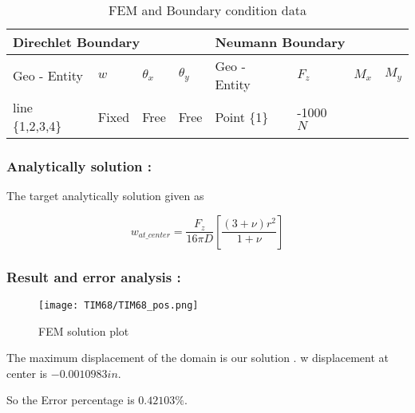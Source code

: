 \documentclass[VM.tex]{subfiles}
\begin{document}
\begin{table}[h!]
\renewcommand{\arraystretch}{1.5}
\centering
\caption{FEM and Boundary condition data}
\label{my-label}
\begin{tabular}{|l|lll|l|lll|}
\hline   \multicolumn{4}{l|}{\cellcolor[HTML]{C0C0C0}Direchlet Boundary} & \multicolumn{4}{l|}{\cellcolor[HTML]{C0C0C0}Neumann Boundary} \\ \hline \hline
 Geo - \newline Entity      & $w$          & $\theta _ x$     & $\theta _ y $    & Geo - \newline Entity         & $F_z$        & $M_x$        & $M_y$        \\ \hline   
line \{1,2,3,4\}                   & Fixed      & Free         & Free        & Point \{1\}                    & -1000 $N$        &           &           \\ \hline
\end{tabular}
\end{table}
\subsubsection*{Analytically solution : }
The target analytically solution given as

\begin{equation}
w_{at\_center} = \frac{F_z}{16 \pi D}\left[ \frac{(3+\nu)r^2}{1+\nu} \right]
\end{equation} 


\subsubsection*{Result and error analysis : }

\begin{figure}[h!]
\centering
{}%
  \texttt{[image: TIM68/TIM68\_pos.png]}
  \caption{FEM solution plot}
\endminipage
\end{figure}
The maximum displacement of the domain is our solution . w displacement at center is $ -0.0010983 in $.


So the Error percentage is $ 0.42103 \% $. 
\end{document}
